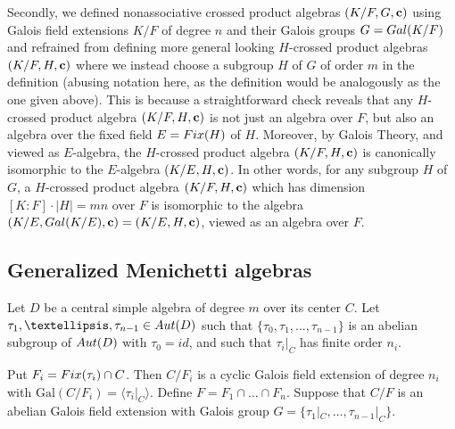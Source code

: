 \documentclass[11pt]{amsart}
\theoremstyle{plain}
\theoremstyle{definition}
\begin{document}
 Secondly, we defined nonassociative crossed product algebras $(K/F,G, {\bf c})$ using Galois field extensions $K/F$ of degree $n$ and their Galois groups $G={\rm Gal}(K/F)$ and refrained from defining more general looking $H$-crossed product algebras $(K/F,H, {\bf c})$ where we instead choose a subgroup $H$ of $G$ of order $m$ in the definition (abusing notation here, as the definition would be analogously as the one given above). This is because a straightforward check reveals that  any $H$-crossed product algebra $(K/F,H, {\bf c})$ is not just an algebra over $F$, but also an algebra over the fixed field $E={\rm Fix}(H)$ of $H$. Moreover, by Galois Theory, and viewed as $E$-algebra, the $H$-crossed product algebra $(K/F,H, {\bf c})$ is canonically isomorphic to the $E$-algebra $(K/E,H, {\bf c})$. In other words, for any subgroup $H$ of $G$, a
 $H$-crossed product algebra $(K/F,H, {\bf c})$ which has  dimension $[K:F]\cdot |H|=mn$ over $F$ is isomorphic to the algebra $(K/E,{\rm Gal}(K/E), {\bf c})=(K/E,H, {\bf c})$, viewed as an algebra over $F$.




\subsection{Generalized Menichetti algebras}
 Let $D$ be a central simple algebra of degree $m$  over its center $C$. Let $\tau_1,\dots,\tau_{n-1}\in {\rm Aut}(D)$ such that $\{\tau_0, \tau_1,\dots,\tau_{n-1}\}$ is an abelian subgroup of ${\rm Aut}(D)$ with $\tau_0=id$, and such that
${\tau_i}|_{C}$ has finite order $n_i$.

Put $F_i={\rm Fix}(\tau_i)\cap C$. Then
  $C/F_i$ is a cyclic Galois field extension of degree $n_i$ with $\mathrm{Gal}(C/F_i) = \langle {\tau_i}|_{C} \rangle$. Define $F=F_1\cap\dots\cap F_n$. Suppose that
   $C/F$ is an abelian Galois field extension with Galois group $G=\{{\tau_1}|_{C},\dots ,{\tau_{n-1}}|_{C}\}$.
\end{document}

